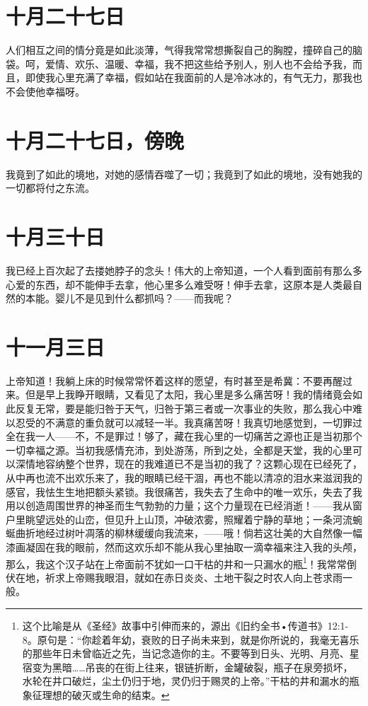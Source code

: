 \documentclass[12pt,oneside]{book}
\begin{document}
\chapter{十月二十七日}
\label{sec-4-21}
人们相互之间的情分竟是如此淡薄，气得我常常想撕裂自己的胸膛，撞碎自己的脑袋。呵，爱情、欢乐、温暖、幸福，我不把这些给予别人，别人也不会给予我，而且，即使我心里充满了幸福，假如站在我面前的人是冷冰冰的，有气无力，那我也不会使他幸福呀。
　　
\chapter{十月二十七日，傍晚}
\label{sec-4-22}
我竟到了如此的境地，对她的感情吞噬了一切；我竟到了如此的境地，没有她我的一切都将付之东流。
　　

\chapter{十月三十日}
\label{sec-4-23}
我已经上百次起了去搂她脖子的念头！伟大的上帝知道，一个人看到面前有那么多心爱的东西，却不能伸手去拿，他心里多么难受呀！伸手去拿，这原本是人类最自然的本能。婴儿不是见到什么都抓吗？——而我呢？
　　

\chapter{十一月三日}
\label{sec-4-24}
上帝知道！我躺上床的时候常常怀着这样的愿望，有时甚至是希冀：不要再醒过来。但是早上我睁开眼睛，又看见了太阳，我心里是多么痛苦呀！我的情绪竟会如此反复无常，要是能归咎于天气，归咎于第三者或一次事业的失败，那么我心中难以忍受的不满意的重负就可以减轻一半。我真痛苦呀！我真切地感觉到，一切罪过全在我一人——不，不是罪过！够了，藏在我心里的一切痛苦之源也正是当初那个一切幸福之源。当初我感情充沛，到处游荡，所到之处，全都是天堂，我的心里可以深情地容纳整个世界，现在的我难道已不是当初的我了？这颗心现在已经死了，从中再也流不出欢乐来了，我的眼睛已经干涸，再也不能以清凉的泪水来滋润我的感官，我怯生生地把额头紧锁。我很痛苦，我失去了生命中的唯一欢乐，失去了我用以创造周围世界的神圣而生气勃勃的力量；这个力量现在已经消逝！——我从窗户里眺望远处的山峦，但见升上山顶，冲破浓雾，照耀着宁静的草地；一条河流蜿蜒曲折地经过树叶凋落的柳林缓缓向我流来，——哦！倘若这壮美的大自然像一幅漆画凝固在我的眼前，然而这欢乐却不能从我心里抽取一滴幸福来注入我的头颅，那么，我这个汉子站在上帝面前不犹如一口干枯的井和一只漏水的瓶\footnote{这个比喻是从《圣经》故事中引伸而来的，源出《旧约全书•传道书》12:1-8。原句是：“你趁着年幼，衰败的日子尚未来到，就是你所说的，我毫无喜乐的那些年日未曾临近之先，当记念造你的主。不要等到日头、光明、月亮、星宿变为黑暗……吊丧的在街上往来，银链折断，金罐破裂，瓶子在泉旁损坏，水轮在井口破烂，尘土仍归于地，灵仍归于赐灵的上帝。”干枯的井和漏水的瓶象征理想的破灭或生命的结束。}！我常常倒伏在地，祈求上帝赐我眼泪，就如在赤日炎炎、土地干裂之时农人向上苍求雨一般。
\end{document}

